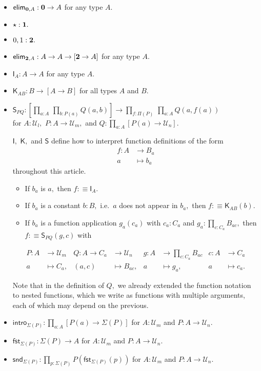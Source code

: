 \documentclass[a4paper]{article}
\theoremstyle{definition}
\theoremstyle{remark}
\let\defeq\equiv
\renewcommand{\equiv}{\simeq}
\newcommand{\univVar}{\mathcal}
\newcommand{\U}{\univVar{U}}
\newcommand{\0}{\primType{0}}
\newcommand{\1}{\primType{1}}
\newcommand{\2}{\primType{2}}
\newcommand{\nm}{\mathsf}
\newcommand{\intro}{\nm{intro}}
\newcommand{\elim}{\nm{elim}}
\newcommand{\fst}{\nm{fst}}
\newcommand{\snd}{\nm{snd}}
\newcommand{\combinator}{\nm}
\newcommand{\idFun}{\combinator{I}}
\newcommand{\constFun}{\combinator{K}}
\newcommand{\revSubstFun}{\combinator{S}}
\begin{document}
\begin{itemize}
  \item $\elim_{\0,A} : \0 \to A$ for any type $A.$

  \item $\star : \1.$

  \item $0,1 : \2.$

  \item $\elim_{\2,A} : A \to A \to [\2 \to A]$ for any type $A.$

  \item $\idFun_A : A \to A$ for any type $A.$

  \item $\constFun_{AB} : B \to [A \to B]$ for all types $A$ and $B.$

  \item $\displaystyle \revSubstFun_{PQ} : \left[\prod_{a : A}\,\prod_{b : P(a)} Q(a,b)\right] \to \prod_{f : \Pi(P)}\,\prod_{a : A} Q(a,f(a))$\\[1ex]
  for $A : \U_l,$ $P : A \to \U_m,$ and $Q : \prod_{a : A} [P(a) \to \U_n].$

  $\idFun,$ $\constFun,$ and $\revSubstFun$ define how to interpret function definitions of the form
  \begin{align*}
    f : A &\to     B_a\\
        a &\mapsto b_a
  \end{align*}
  throughout this article.
  \begin{itemize}
    \item If $b_a$ is $a,$ then $f :\defeq \idFun_A.$
    \item If $b_a$ is a constant $b : B,$ i.e.\ $a$ does not appear in $b_a,$ then
    $f :\defeq \constFun_{AB}(b).$
    \item If $b_a$ is a function application $g_a(c_a)$ with $c_a : C_a$ and
    $g_a : \prod_{c : C_a} B_{ac},$ then $f :\defeq \revSubstFun_{PQ}(g,c)$ with
  \end{itemize}
  \begin{align*}
    P : A &\to     \U_m & Q : A \to C_a &\to     \U_n   & g : A &\to     \textstyle\prod_{c : C_a} B_{ac} & c : A &\to     C_a\\
        a &\mapsto C_a, &     (a,c)     &\mapsto B_{ac},&     a &\mapsto g_a,                             &     a &\mapsto c_a.
  \end{align*}

  Note that in the definition of $Q,$ we already extended the function notation to nested functions,
  which we write as functions with multiple arguments, each of which may depend on the previous.

  \item $\intro_{\Sigma(P)} : \prod_{a : A} [P(a) \to \Sigma(P)]$ for $A : \U_m$ and $P : A \to \U_n.$

  \item $\fst_{\Sigma(P)} : \Sigma(P) \to A$ for $A : \U_m$ and $P : A \to \U_n.$

  \item $\snd_{\Sigma(P)} : \prod_{p : \Sigma(P)} P(\fst_{\Sigma(P)}(p))$ for $A : \U_m$ and $P : A \to \U_n.$
\end{itemize}
\end{document}
